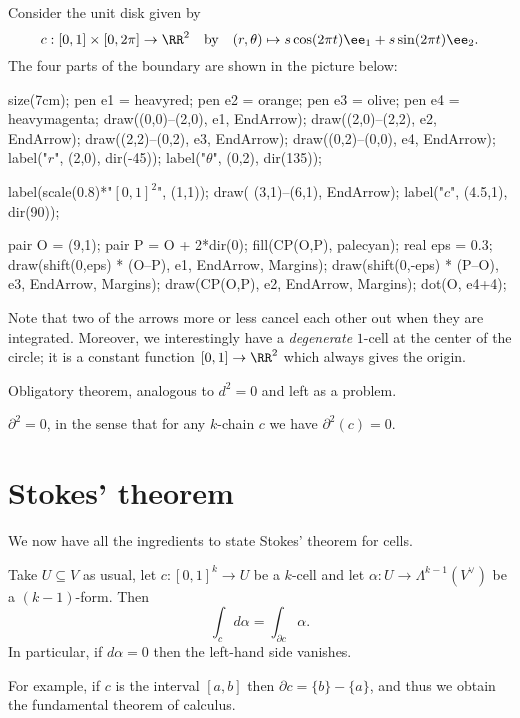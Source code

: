 \begin{example}
	Consider the unit disk given by
	\[ c : [0,1] \times [0,2\pi] \to \RR^2 \quad\text{by}\quad
	(r,\theta) \mapsto s\cos(2\pi t)\ee_1 + s\sin(2\pi t)\ee_2. \]
	The four parts of the boundary are shown in the picture below:
	\begin{center}
		\begin{asy}
			size(7cm);
			pen e1 = heavyred;
			pen e2 = orange;
			pen e3 = olive;
			pen e4 = heavymagenta;
			draw((0,0)--(2,0), e1, EndArrow);
			draw((2,0)--(2,2), e2, EndArrow);
			draw((2,2)--(0,2), e3, EndArrow);
			draw((0,2)--(0,0), e4, EndArrow);
			label("$r$", (2,0), dir(-45));
			label("$\theta$", (0,2), dir(135));

			label(scale(0.8)*"$[0,1]^2$", (1,1));
			draw( (3,1)--(6,1), EndArrow);
			label("$c$", (4.5,1), dir(90));

			pair O = (9,1);
			pair P = O + 2*dir(0);
			fill(CP(O,P), palecyan);
			real eps = 0.3;
			draw(shift(0,eps) * (O--P), e1, EndArrow, Margins);
			draw(shift(0,-eps) * (P--O), e3, EndArrow, Margins);
			draw(CP(O,P), e2, EndArrow, Margins);
			dot(O, e4+4);
		\end{asy}
	\end{center}
	Note that two of the arrows more or less cancel each other out when they are integrated.
	Moreover, we interestingly have a \emph{degenerate} $1$-cell at the center of the circle;
	it is a constant function $[0,1] \to \RR^2$ which always gives the origin.
\end{example}

Obligatory theorem, analogous to $d^2=0$ and left as a problem.
\begin{theorem}
	$\partial^2 = 0$, in the sense that for any $k$-chain $c$ we have $\partial^2(c) = 0$.
\end{theorem}

\section{Stokes' theorem}

We now have all the ingredients to state Stokes' theorem for cells.
\begin{theorem}
	Take $U \subseteq V$ as usual, let $c : [0,1]^k \to U$ be a $k$-cell
	and let $\alpha : U \to \Lambda^{k-1}(V^\vee)$ be a $(k-1)$-form.
	Then
	\[ \int_c d\alpha = \int_{\partial c} \alpha. \]
	In particular, if $d\alpha = 0$ then the left-hand side vanishes.
\end{theorem}
For example, if $c$ is the interval $[a,b]$ then $\partial c = \{b\} - \{a\}$,
and thus we obtain the fundamental theorem of calculus.


